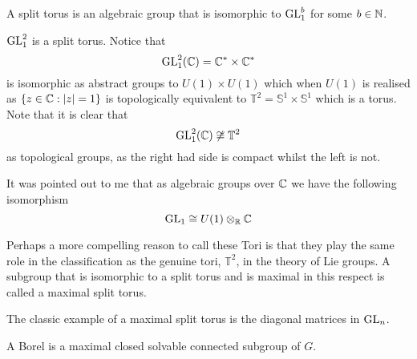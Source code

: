     \begin{definition}
        A split torus is an algebraic group that is isomorphic to \(\operatorname{GL}_1^b\) for some \(b\in\N\).
    \end{definition}

    \begin{example}
        \(\operatorname{GL}^2_1\) is a split torus. Notice that 
        \[\GL^2_1(\C) = \C^\ast\times \C^\ast\]
        is isomorphic as abstract groups to \(U(1)\times U(1)\) which when \(U(1)\) is realised as \(\{z\in \C : |z| = 1\}\) is topologically equivalent to \(\mathbb{T}^2 = \mathbb{S}^1\times \mathbb{S}^1 \) which is a torus. Note that it is clear that 
        \[\GL^2_1(\C) \not\cong \mathbb{T}^2 \]
        as topological groups, as the right had side is compact whilst the left is not.

        It was pointed out to me that as algebraic groups over \(\C\) we have the following isomorphism
        \[\GL_1 \cong U(1)\tensor_\R \C\]
    \end{example}
    
     Perhaps a more compelling reason to call these Tori is that they play the same role in the classification as the genuine tori, \(\mathbb{T}^2\), in the theory of Lie groups.  A subgroup that is isomorphic to a split torus and is maximal in this respect is called a maximal split torus. 
     \begin{example}
        The classic example of a maximal split torus is the diagonal matrices in \(\operatorname{GL}_n\).
     \end{example}

    \begin{definition}
        A Borel is a maximal closed solvable connected subgroup of \(G\).
    \end{definition}

